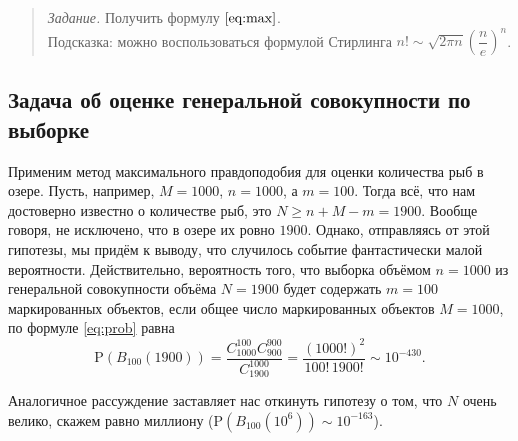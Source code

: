 \documentclass[11pt,a4paper]{article}
\begin{document}
\begin{quote}
\emph{Задание.} Получить формулу \(\eqref{eq:max}\).\\
Подсказка: можно воспользоваться формулой Стирлинга
\(n! \sim \sqrt{2 \pi n}\left( \dfrac{n}{e} \right)^n\).
\end{quote}

    \hypertarget{ux437ux430ux434ux430ux447ux430-ux43eux431-ux43eux446ux435ux43dux43aux435-ux433ux435ux43dux435ux440ux430ux43bux44cux43dux43eux439-ux441ux43eux432ux43eux43aux443ux43fux43dux43eux441ux442ux438-ux43fux43e-ux432ux44bux431ux43eux440ux43aux435}{%
\subsection{Задача об оценке генеральной совокупности по
выборке}\label{ux437ux430ux434ux430ux447ux430-ux43eux431-ux43eux446ux435ux43dux43aux435-ux433ux435ux43dux435ux440ux430ux43bux44cux43dux43eux439-ux441ux43eux432ux43eux43aux443ux43fux43dux43eux441ux442ux438-ux43fux43e-ux432ux44bux431ux43eux440ux43aux435}}

Применим метод максимального правдоподобия для оценки количества рыб в
озере. Пусть, например, \(M=1000\), \(n=1000\), а \(m=100\). Тогда всё,
что нам достоверно известно о количестве рыб, это
\(N \ge n + M - m = 1900\). Вообще говоря, не исключено, что в озере их
ровно \(1900\). Однако, отправляясь от этой гипотезы, мы придём к
выводу, что случилось событие фантастически малой вероятности.
Действительно, вероятность того, что выборка объёмом \(n=1000\) из
генеральной совокупности объёма \(N=1900\) будет содержать \(m=100\)
маркированных объектов, если общее число маркированных объектов
\(M=1000\), по формуле \eqref{eq:prob} равна \[
    \mathrm{P}(B_{100}(1900)) = \frac{C_{1000}^{100} C_{900}^{900}}{C_{1900}^{1000}} = \frac{(1000!)^2}{100! \, 1900!} \sim 10^{-430}.
\]

Аналогичное рассуждение заставляет нас откинуть гипотезу о том, что
\(N\) очень велико, скажем равно миллиону
(\(\mathrm{P}(B_{100}(10^6)) \sim 10^{-163}\)).
\end{document}
